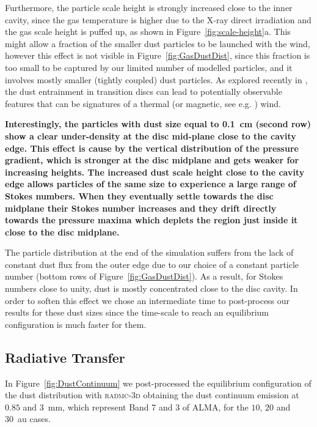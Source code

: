 \documentclass[fleqn,usenatbib]{mnras}
\begin{document}
        Furthermore, the particle scale height is strongly increased close to the inner cavity, since the gas temperature is higher due to the X-ray direct irradiation and the gas scale height is puffed up, as shown in Figure~\ref{fig:scale-height}a. This might allow a fraction of the smaller dust particles to be launched with the wind, however this effect is not visible in Figure~\ref{fig:GasDustDist}, since this fraction is too small to be captured by our limited number of modelled particles, and it involves mostly smaller (tightly coupled) dust particles. As explored recently in \citet{Franz2022}, the dust entrainment in transition discs can lead to potentially observable features that can be signatures of a thermal (or magnetic, see e.g. \citet{Rodenkirch2022}) wind.

        \textbf{Interestingly, the particles with dust size equal to \SI{0.1}{cm} (second row) show a clear under-density at the disc mid-plane close to the cavity edge. This effect is cause by the vertical distribution of the pressure gradient, which is stronger at the disc midplane and gets weaker for increasing heights. The increased dust scale height close to the cavity edge allows particles of the same size to experience a large range of Stokes numbers. When they eventually settle towards the disc midplane their Stokes number increases and they drift directly towards the pressure maxima which deplets the region just inside it close to the disc midplane.}
        
        The particle distribution at the end of the simulation suffers from the lack of constant dust flux from the outer edge due to our choice of a constant particle number (bottom rows of Figure~\ref{fig:GasDustDist}). As a result, for Stokes numbers close to unity, dust is mostly concentrated close to the disc cavity. In order to soften this effect we chose an intermediate time to post-process our results for these dust sizes since the time-scale to reach an equilibrium configuration is much faster for them.
  
    \subsection{Radiative Transfer} \label{sec:radiative-transfer}
        In Figure~\ref{fig:DustContinuum} we post-processed the equilibrium configuration of the dust distribution with \textsc{radmc-3d} obtaining the dust continuum emission at $0.85$ and \SI{3}{mm}, which represent Band 7 and 3 of ALMA, for the $10$, $20$ and \SI{30}{au} cases.
        
\end{document}
